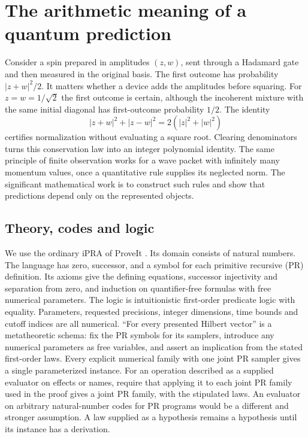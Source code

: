 \section{The arithmetic meaning of a quantum prediction}\label{sec:arithmetic}
Consider a spin prepared in amplitudes $(z,w)$, sent through a Hadamard gate and then measured in the original basis. The first outcome has probability $|z+w|^2/2$. It matters whether a device adds the amplitudes before squaring. For $z=w=1/\sqrt2$ the first outcome is certain, although the incoherent mixture with the same initial diagonal has first-outcome probability $1/2$. The identity
\[
 |z+w|^2+|z-w|^2=2(|z|^2+|w|^2)
\]
certifies normalization without evaluating a square root. Clearing denominators turns this conservation law into an integer polynomial identity. The same principle of finite observation works for a wave packet with infinitely many momentum values, once a quantitative rule supplies its neglected norm. The significant mathematical work is to construct such rules and show that predictions depend only on the represented objects.

\subsection{Theory, codes and logic}
We use the ordinary iPRA of ProveIt \cite{proveit}. Its domain consists of natural numbers. The language has zero, successor, and a symbol for each primitive recursive (PR) definition. Its axioms give the defining equations, successor injectivity and separation from zero, and induction on quantifier-free formulas with free numerical parameters. The logic is intuitionistic first-order predicate logic with equality. Parameters, requested precisions, integer dimensions, time bounds and cutoff indices are all numerical. ``For every presented Hilbert vector'' is a metatheoretic schema: fix the PR symbols for its samplers, introduce any numerical parameters as free variables, and assert an implication from the stated first-order laws. Every explicit numerical family with one joint PR sampler gives a single parameterized instance. For an operation described as a supplied evaluator on effects or names, require that applying it to each joint PR family used in the proof gives a joint PR family, with the stipulated laws. An evaluator on arbitrary natural-number codes for PR programs would be a different and stronger assumption. A law supplied as a hypothesis remains a hypothesis until its instance has a derivation.

